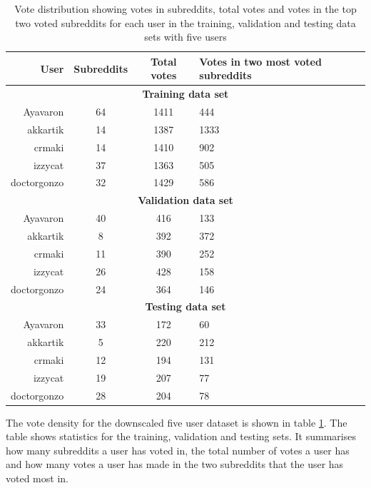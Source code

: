 \begin{table}[H]
    \centering
    \begin{tabular}{ r | c | c | p{4cm}  }
    \textbf{User} & \textbf{Subreddits} & \textbf{Total votes} & \textbf{Votes in two most voted subreddits} \\ \hline \hline
    \multicolumn{4}{c}{\textbf{Training data set}} \\ \hline \hline
    Ayavaron & 64 & 1411 & 444 \\ \hline
    akkartik & 14  & 1387 & 1333 \\ \hline
    crmaki & 14 & 1410 & 902 \\ \hline
    izzycat & 37 & 1363 & 505 \\ \hline
    doctorgonzo & 32 & 1429 & 586 \\ \hline \hline
    \multicolumn{4}{c}{\textbf{Validation data set}} \\ \hline \hline
    Ayavaron & 40 & 416 & 133 \\ \hline
    akkartik & 8  & 392 & 372 \\ \hline
    crmaki & 11 & 390 & 252 \\ \hline
    izzycat & 26 & 428 & 158 \\ \hline
    doctorgonzo & 24 & 364 & 146 \\ \hline \hline
    \multicolumn{4}{c}{\textbf{Testing data set}} \\ \hline \hline
    Ayavaron & 33 & 172 & 60 \\ \hline
    akkartik & 5  & 220 & 212 \\ \hline
    crmaki & 12 & 194 & 131 \\ \hline
    izzycat & 19 & 207 & 77 \\ \hline
    doctorgonzo & 28 & 204 & 78 \\ \hline
    \end{tabular}
    \caption{Vote distribution showing votes in subreddits, total votes and votes in the top two voted subreddits for each user in the training, validation and testing data sets with five users}
    \label{table:5_user_density}
\end{table}
The vote density for the downscaled five user dataset is shown in table \ref{table:5_user_density}. The table shows statistics for the training, validation and testing sets. It summarises how many subreddits a user has voted in, the total number of votes a user has and how many votes a user has made in the two subreddits that the user has voted most in.

